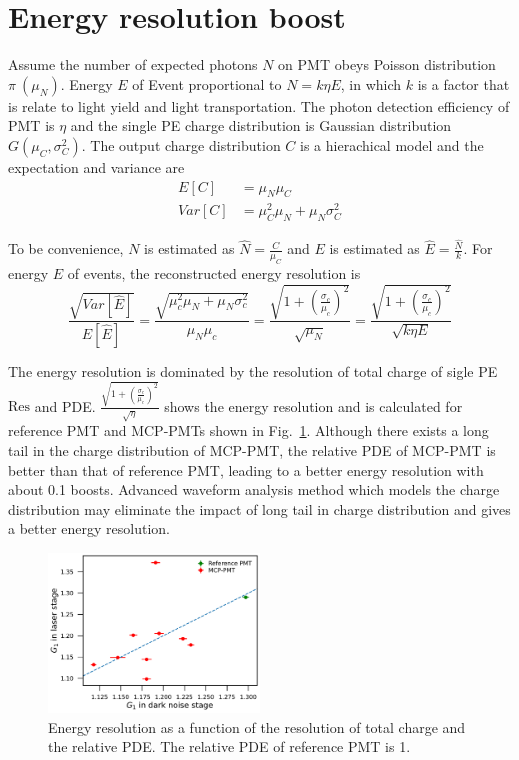 \section{Energy resolution boost}
\label{Result}
Assume the number of expected photons $N$ on PMT obeys Poisson distribution $\pi~(\mu_N)$. Energy $E$ of Event proportional to $N=k\eta E$, in which $k$ is a factor that is relate to light yield and light transportation. The photon detection efficiency of PMT is $\eta$ and the single PE charge distribution is Gaussian distribution $G(\mu_C,\sigma_C^2)$. The output charge distribution $C$ is a hierachical model and the expectation and variance are
\begin{align}
    E[C]&=\mu_N\mu_C\\
    Var[C]&=\mu_C^2\mu_N+\mu_N\sigma_C^2
\end{align}

To be convenience, $N$ is estimated as $\hat{N}=\frac{C}{\mu_C}$ and $E$ is estimated as $\hat{E}=\frac{\hat{N}}{k}$. For  energy $E$ of events, the reconstructed energy resolution is 
\begin{equation}
    \frac{\sqrt{Var[\hat{E}]}}{E[\hat{E}]}=\frac{\sqrt{\mu_c^2\mu_N+\mu_N\sigma_c^2}}{\mu_N\mu_c}=\frac{\sqrt{1+(\frac{\sigma_c}{\mu_c})^2}}{\sqrt{\mu_N}}=\frac{\sqrt{1+(\frac{\sigma_c}{\mu_c})^2}}{\sqrt{k\eta E}}
\end{equation}

The energy resolution is dominated by the resolution of total charge of sigle PE $\mathrm{Res}$ and PDE. $\frac{\sqrt{1+(\frac{\sigma_c}{\mu_c})^2}}{\sqrt{\eta}}$ shows the energy resolution and is calculated for reference PMT and MCP-PMTs shown in Fig.~\ref{fig:EnergyResolution}. Although there exists a long tail in the charge distribution of MCP-PMT, the relative PDE of MCP-PMT is better than that of reference PMT, leading to a better energy resolution with about 0.1 boosts. Advanced waveform analysis method which models the charge distribution may eliminate the impact of long tail in charge distribution and gives a better energy resolution.
\begin{figure}[!htbp]
    \centering
    \includegraphics[width=0.5\textwidth,page=14]{figures/result/compare.pdf}
    \caption{Energy resolution as a function of the resolution of total charge and the relative PDE. The relative PDE of reference PMT is 1.}
    \label{fig:EnergyResolution}
\end{figure}